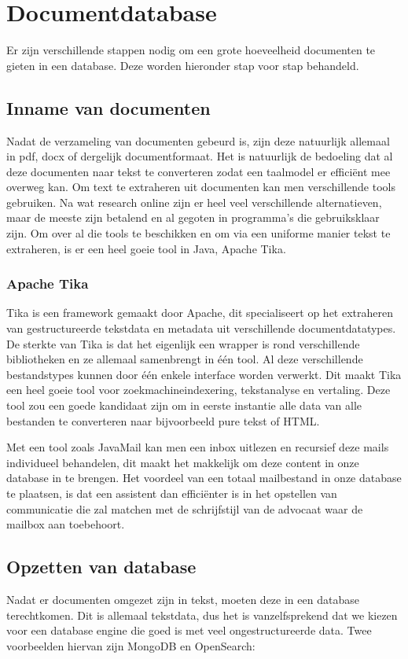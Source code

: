 \chapter{Documentdatabase}
Er zijn verschillende stappen nodig om een grote hoeveelheid documenten te gieten in een database.
Deze worden hieronder stap voor stap behandeld.

\section{Inname van documenten}
Nadat de verzameling van documenten gebeurd is, zijn deze natuurlijk allemaal in pdf, docx of dergelijk documentformaat.
Het is natuurlijk de bedoeling dat al deze documenten naar tekst te converteren zodat een taalmodel er efficiënt mee overweg kan.
Om text te extraheren uit documenten kan men verschillende tools gebruiken.
Na wat research online zijn er heel veel verschillende alternatieven, maar de meeste zijn betalend en al gegoten in programma's die gebruiksklaar zijn.
Om over al die tools te beschikken en om via een uniforme manier tekst te extraheren, is er een heel goeie tool in Java, Apache Tika.

\subsection{Apache Tika}
Tika is een framework gemaakt door Apache, dit specialiseert op het extraheren van gestructureerde tekstdata en metadata uit verschillende documentdatatypes.
De sterkte van Tika is dat het eigenlijk een wrapper is rond verschillende bibliotheken en ze allemaal samenbrengt in één tool.
Al deze verschillende bestandstypes kunnen door één enkele interface worden verwerkt.
Dit maakt Tika een heel goeie tool voor zoekmachineindexering, tekstanalyse en vertaling.
Deze tool zou een goede kandidaat zijn om in eerste instantie alle data van alle bestanden te converteren naar bijvoorbeeld pure tekst of HTML.

Met een tool zoals JavaMail kan men een inbox uitlezen en recursief deze mails individueel behandelen, dit maakt het makkelijk om deze content in onze database in te brengen.
Het voordeel van een totaal mailbestand in onze database te plaatsen,
is dat een assistent dan efficiënter is in het opstellen van communicatie die zal matchen met de schrijfstijl van de advocaat waar de mailbox aan toebehoort.

\section{Opzetten van database}
Nadat er documenten omgezet zijn in tekst, moeten deze in een database terechtkomen.
Dit is allemaal tekstdata, dus het is vanzelfsprekend dat we kiezen voor een database engine die goed is met veel ongestructureerde data.
Twee voorbeelden hiervan zijn MongoDB en OpenSearch:


